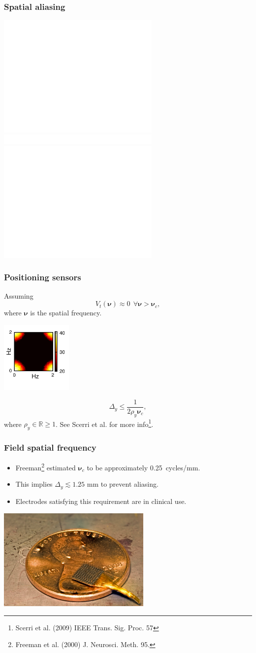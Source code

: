 \documentclass[compress]{beamer}
\begin{document}
\begin{frame}\frametitle{Spatial aliasing}
	\includegraphics<1-2>[height=6cm]{./Figures/205px-Moire_pattern_of_bricks.pdf}
	\includegraphics<2>[height=0.5cm]{./Figures/WhiteSpace.pdf}
	\includegraphics<2>[height=6cm]{./Figures/Moire_pattern_of_bricks_small.pdf}	
\end{frame}

\begin{frame}\frametitle{Positioning sensors}
Assuming
\begin{equation}
	V_t(\boldsymbol{\nu}) \approx 0 ~ \ \forall \boldsymbol{\nu} > \boldsymbol{\nu}_c,
\end{equation}
where $\boldsymbol\nu$ is the spatial frequency. 
\begin{center}
\includegraphics[height=3.5cm]{./Figures/Figure4a.pdf}
\end{center}
\pause
\begin{equation}
	\label{eq:MinimumSensorDistance} \Delta_y \leq \frac{1}{2\rho_y\boldsymbol{\nu}_{c}}, 
\end{equation}
where $\rho_y \in \mathbb{R} \ge 1$. See Scerri et al. for more info\footnote{Scerri et al. (2009) IEEE Trans. Sig. Proc. 57}. \\ 
\end{frame}

\begin{frame}\frametitle{Field spatial frequency}
	\begin{itemize}
\item Freeman\footnote{Freeman et al. (2000) J. Neurosci. Meth. 95.} estimated $\boldsymbol{\nu}_c$ to be approximately 0.25~cycles/mm.
\pause
  \item This implies $\Delta_y \lesssim 1.25$ mm to prevent aliasing.
\pause
  \item Electrodes satisfying this requirement are in clinical use.
 \end{itemize}
	\begin{center}
		\includegraphics[height=5cm]{./Figures/UtahArray.pdf}
	\end{center}
\end{frame}
\end{document}
